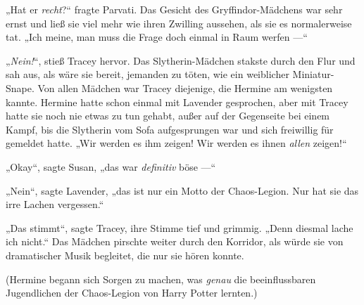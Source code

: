 „Hat er \emph{recht}?“ fragte Parvati. Das Gesicht des Gryffindor-Mädchens war sehr ernst und ließ sie viel mehr wie ihren Zwilling aussehen, als sie es normalerweise tat.
„Ich meine, man muss die Frage doch einmal in Raum werfen —“

„\emph{Nein!}“, stieß Tracey hervor. Das Slytherin-Mädchen stakste durch den Flur und sah aus, als wäre sie bereit, jemanden zu töten, wie ein weiblicher Miniatur-Snape. Von allen Mädchen war Tracey diejenige, die Hermine am wenigsten kannte. Hermine hatte schon einmal mit Lavender gesprochen, aber mit Tracey hatte sie noch nie etwas zu tun gehabt, außer auf der Gegenseite bei einem Kampf, bis die Slytherin vom Sofa aufgesprungen war und sich freiwillig für \SPHEW gemeldet hatte.
„Wir werden es ihm zeigen! Wir werden es ihnen \emph{allen} zeigen!“

„Okay“, sagte Susan, „das war \emph{definitiv} böse —“

„Nein“, sagte Lavender, „das ist nur ein Motto der Chaos-Legion. Nur hat sie das irre Lachen vergessen.“

„Das stimmt“, sagte Tracey, ihre Stimme tief und grimmig.
„Denn diesmal lache ich nicht.“ Das Mädchen pirschte weiter durch den Korridor, als würde sie von dramatischer Musik begleitet, die nur sie hören konnte.

(Hermine begann sich Sorgen zu machen, was \emph{genau} die beeinflussbaren Jugendlichen der Chaos-Legion von Harry Potter lernten.)

